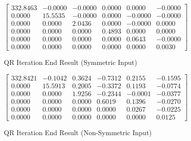 \documentclass{article}
\begin{document}
\begin{figure}
\centering
\(
\begin{bmatrix}
  332.8463 &  -0.0000 &  -0.0000 &   0.0000 &   0.0000 &  -0.0000 \\[0.3em]
    0.0000 &  15.5535 &  -0.0000 &   0.0000 &  -0.0000 &  -0.0000 \\[0.3em]
    0.0000 &   0.0000 &   2.0436 &   0.0000 &  -0.0000 &   0.0000 \\[0.3em]
    0.0000 &   0.0000 &   0.0000 &   0.4893 &   0.0000 &   0.0000 \\[0.3em]
    0.0000 &   0.0000 &   0.0000 &   0.0000 &   0.0643 &  -0.0000 \\[0.3em]
    0.0000 &   0.0000 &   0.0000 &   0.0000 &   0.0000 &   0.0030
\end{bmatrix}
\)
\label{p3m1}
\caption{QR Iteration End Result (Symmetric Input)}
\end{figure}


\begin{figure}
\centering
\(
\begin{bmatrix}
  332.8421 & -0.1042  & 0.3624 & -0.7312 &  0.2155 & -0.1595 \\[0.3em]
    0.0000 & 15.5913  & 0.2005 & -0.3372 &  0.1193 & -0.0774 \\[0.3em]
    0.0000 &  0.0000  & 1.9256 & -0.2344 & -0.0001 & -0.0377 \\[0.3em]
    0.0000 &  0.0000  & 0.0000 &  0.6019 &  0.1396 & -0.0270 \\[0.3em]
    0.0000 &  0.0000  & 0.0000 &  0.0000 &  0.0267 & -0.0225 \\[0.3em]
    0.0000 &  0.0000  & 0.0000 &  0.0000 &  0.0000 &  0.0125
\end{bmatrix}
\)
\label{p3m2}
\caption{QR Iteration End Result (Non-Symmetric Input)}
\end{figure}
\end{document}
